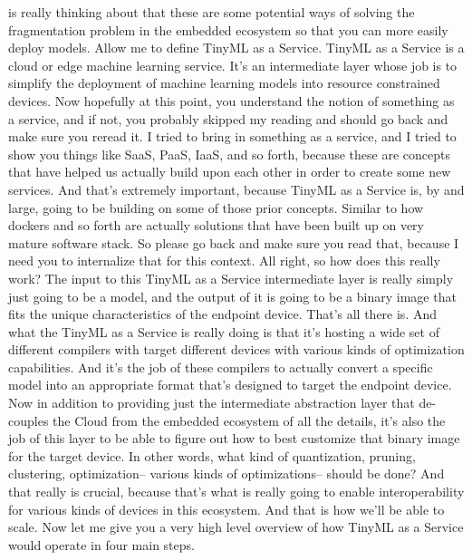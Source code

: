{{{{{    is really thinking about that these are some potential ways of solving
    the fragmentation problem in the embedded ecosystem
    so that you can more easily deploy models.
    Allow me to define TinyML as a Service.
    TinyML as a Service is a cloud or edge machine learning service.
    It's an intermediate layer whose job is to simplify
    the deployment of machine learning models
    into resource constrained devices.
    Now hopefully at this point, you understand the notion of something
    as a service, and if not, you probably skipped my reading
    and should go back and make sure you reread it.
    I tried to bring in something as a service,
    and I tried to show you things like SaaS, PaaS, IaaS,
    and so forth, because these are concepts that have helped us actually
    build upon each other in order to create some new services.
    And that's extremely important, because TinyML as a Service is, by and large,
    going to be building on some of those prior concepts.
    Similar to how dockers and so forth are actually
    solutions that have been built up on very mature software stack.
    So please go back and make sure you read that,
    because I need you to internalize that for this context.
    All right, so how does this really work?
    The input to this TinyML as a Service intermediate layer
    is really simply just going to be a model, and the output of it
    is going to be a binary image that fits the unique characteristics
    of the endpoint device.
    That's all there is.
    And what the TinyML as a Service is really doing
    is that it's hosting a wide set of different compilers
    with target different devices with various kinds of optimization
    capabilities.
    And it's the job of these compilers to actually convert a specific model
    into an appropriate format that's designed to target the endpoint device.
    Now in addition to providing just the intermediate abstraction
    layer that de-couples the Cloud from the embedded ecosystem of all the details,
    it's also the job of this layer to be able to figure out
    how to best customize that binary image for the target device.
    In other words, what kind of quantization, pruning, clustering,
    optimization-- various kinds of optimizations-- should be done?
    And that really is crucial, because that's
    what is really going to enable interoperability
    for various kinds of devices in this ecosystem.
    And that is how we'll be able to scale.
    Now let me give you a very high level overview of how TinyML as a Service
    would operate in four main steps.
}}}}}
